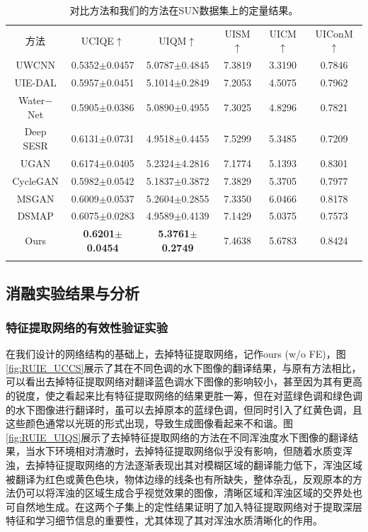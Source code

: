 \begin{table}[ht]%
\centering
\caption{对比方法和我们的方法在SUN数据集上的定量结果。}
  \begin{tabular}{c|cc|ccc}
    \hline\noalign{\smallskip}
    方法 &UCIQE$\uparrow$ & UIQM$\uparrow$ & UISM$\uparrow$ & UICM$\uparrow$ & UIConM$\uparrow$ \\
    \noalign{\smallskip}\hline\noalign{\smallskip}
    UWCNN\cite{li2020underwater} & 0.5352$\pm$0.0457 & 5.0787$\pm$0.4845 & 7.3819 & 3.3190 & 0.7846 \\
    UIE-DAL\cite{uplavikar2019all} & 0.5957$\pm$0.0451 & 5.1014$\pm$0.2849 & 7.2053 & 4.5075 & 0.7962 \\
    Water$-$Net\cite{li2019underwater} & 0.5905$\pm$0.0386 & 5.0890$\pm$0.4955 & 7.3025 & 4.8296 & 0.7821 \\
    Deep SESR\cite{islam2020simultaneous} & 0.6131$\pm$0.0731 & 4.9518$\pm$0.4455 & 7.5299 & 5.3485 & 0.7209 \\
    UGAN\cite{fabbri2018enhancing} & 0.6174$\pm$0.0405 & 5.2324$\pm$4.2816 & 7.1774 & 5.1393 & 0.8301 \\
    CycleGAN\cite{zhu2017unpaired} & 0.5982$\pm$0.0542 & 5.1837$\pm$0.3872 & 7.3829 & 5.3705 & 0.7977 \\
    MSGAN\cite{mao2019mode} & 0.6009$\pm$0.0537 & 5.2604$\pm$0.2855 & 7.3350 & 6.0466 & 0.8178 \\
    DSMAP\cite{chang2020domain} & 0.6075$\pm$0.0283 & 4.9589$\pm$0.4139 & 7.1429 & 5.0375 & 0.7573 \\
    Ours & \textbf{0.6201$\pm$0.0454} & \textbf{5.3761$\pm$0.2749} & 7.4638 & 5.6783 & 0.8424 \\
    \noalign{\smallskip}\hline
  \end{tabular}
  \label{tab:sun}
\end{table}

\subsection{消融实验结果与分析}

\subsubsection{特征提取网络的有效性验证实验}

在我们设计的网络结构的基础上，去掉特征提取网络，记作ours (w/o FE)，图\ref{fig:RUIE_UCCS}展示了其在不同色调的水下图像的翻译结果，与原有方法相比，可以看出去掉特征提取网络对翻译蓝色调水下图像的影响较小，甚至因为其有更高的锐度，使之看起来比有特征提取网络的结果更胜一筹，但在对蓝绿色调和绿色调的水下图像进行翻译时，虽可以去掉原本的蓝绿色调，但同时引入了红黄色调，且这些颜色通常以光斑的形式出现，导致生成图像看起来不和谐。图\ref{fig:RUIE_UIQS}展示了去掉特征提取网络的方法在不同浑浊度水下图像的翻译结果，当水下环境相对清澈时，去掉特征提取网络似乎没有影响，但随着水质变浑浊，去掉特征提取网络的方法逐渐表现出其对模糊区域的翻译能力低下，浑浊区域被翻译为红色或黄色色块，物体边缘的线条也有所缺失，整体杂乱，反观原本的方法仍可以将浑浊的区域生成合乎视觉效果的图像，清晰区域和浑浊区域的交界处也可自然地生成。在这两个子集上的定性结果证明了加入特征提取网络对于提取深层特征和学习细节信息的重要性，尤其体现了其对浑浊水质清晰化的作用。

